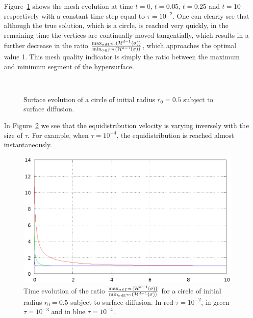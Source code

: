 Figure~\ref{fig:sd_circle} shows the mesh evolution at time $t=0$, $t=0.05$,
$t=0.25$ and $t=10$ respectively with a constant time step equal to
$\tau=10^{-2}$. One can clearly see that although the true solution, which is a
circle, is reached very quickly, in the remaining time the vertices are
continually moved tangentially, which results in a further decrease in the ratio
$\frac{\max_{\sigma\in \Gamma^m}(\mathcal{H}^{d-1}(\sigma))}
{\min_{\sigma\in\Gamma^m}(\mathcal{H}^{d-1}(\sigma))}$, which approaches the optimal
value 1. This mesh quality indicator is simply the ratio between the maximum
and minimum segment of the hypersurface.

\begin{figure}[htbp]
\centering
{}
\\
\caption[Surface diffusion equidistribution property]{Surface evolution of a
circle of initial radius $r_0=0.5$ subject to surface diffusion.}
\label{fig:sd_circle}
\end{figure}

In Figure~\ref{fig:sd_circle_tau} we see that the equidistribution velocity is
varying inversely with the size of $\tau$. For example, when $\tau=10^{-4}$,
the equidistribution is reached almost instantaneously.

\begin{figure}[htbp]
\centering
\includegraphics[width=.45\textwidth]
{figures/geometric_pdes/sd_circle_tau.ps}
\caption[Surface diffusion equidistribution velocity]{Time evolution of the
ratio $\frac{\max_{\sigma\in \Gamma^m}(\mathcal{H}^{d-1}(\sigma))}
{\min_{\sigma\in\Gamma^m}(\mathcal{H}^{d-1}(\sigma))}$ for a circle of initial radius
$r_0=0.5$ subject to surface diffusion. In red $\tau=10^{-2}$, in green
$\tau=10^{-3}$ and in blue $\tau=10^{-4}$.}
\label{fig:sd_circle_tau}
\end{figure}

